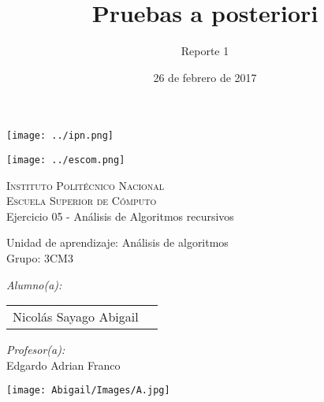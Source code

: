 \documentclass[12pt]{article}
\date{26 de febrero de 2017}
\title{Pruebas a posteriori}
\author{Reporte 1}
\begin{document}
\begin{titlepage}
			\begin{center}
				\noindent
				\begin{minipage}{0.5\textwidth}
					\begin{flushleft} \large
						\texttt{[image: ../ipn.png]}
					\end{flushleft}
				\end{minipage}%
				\begin{minipage}{0.55\textwidth}
					\begin{flushright} \large
						\texttt{[image: ../escom.png]}
					\end{flushright}
				\end{minipage}
				
				\textsc{\LARGE Instituto Politécnico Nacional}\\[0.5cm]
				
				\textsc{\Large Escuela Superior de Cómputo}\\[1cm]
				
				
				{ \huge Ejercicio 05 - Análisis de Algoritmos recursivos  \\[1cm] }
				
				{ \Large Unidad de aprendizaje: Análisis de algoritmos} \\[1cm]
				
				{ \Large Grupo: 3CM3 } \\[1cm]
				
				\noindent
				\begin{minipage}{0.5\textwidth}
					\begin{flushleft} \large
						\emph{Alumno(a):}\\
						
						\begin{tabular}{ll}
					     Nicolás Sayago Abigail\\
					\end{tabular}
					\end{flushleft}
				\end{minipage}%
				\begin{minipage}{0.5\textwidth}
					\begin{flushright} \large
						\emph{Profesor(a):} \\
					    Edgardo Adrian Franco  \\
					\end{flushright}
				\end{minipage}
				\vfill
				\begin{minipage}{0.5\textwidth}
					\begin{center} \large
						\texttt{[image: Abigail/Images/A.jpg]}
					\end{center}
				\end{minipage}
					

\end{center}
\end{titlepage}
\end{document}
